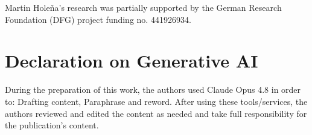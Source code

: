 \documentclass{ceurart}
\begin{document}








\begin{acknowledgments}
	Martin Holeňa’s research was partially supported by the German Research Foundation (DFG) project funding no. 441926934.
\end{acknowledgments}

\section*{Declaration on Generative AI}

During the preparation of this work, the authors used Claude Opus 4.8 in order to: Drafting content, Paraphrase and reword. After using these tools/services, the authors reviewed and edited the content as needed and take full responsibility for the publication’s content.


\end{document}
